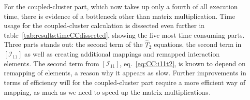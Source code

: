 For the coupled-cluster part, which now takes up only a fourth of all execution time, there is evidence of a bottleneck other than matrix multiplication.
Time usage for the coupled-cluster calculation is dissected even further in table~\ref{tab:results:timeCCdissected}, showing the five most time-consuming parts.
Three parts stands out: the second term of the $\hat{T}_2$ equations, the second term in $\left[\mathcal{I}_{11}\right]$ as well as creating additional mappings and remapped interaction elements.
The second term from $\left[\mathcal{I}_{11}\right]$, eq.~\eqref{eq:CC:i11t2}, is known to depend on remapping of elements, a reason why it appears as slow.
Further improvements in terms of efficiency will for the coupled-cluster part require a more efficient way of mapping, as much as we need to speed up the matrix multiplications.
\begin{table}
\caption{The most time-consuming terms of CCSD. Labeled `Init. maps' is the time spent inside the method `CC::init\_additional\_mappings()' which creates mappings not included by the `Basis' class.}
\label{tab:results:timeCCdissected}
\begin{center}
\hspace{5mm}
\end{center}
\end{table}




